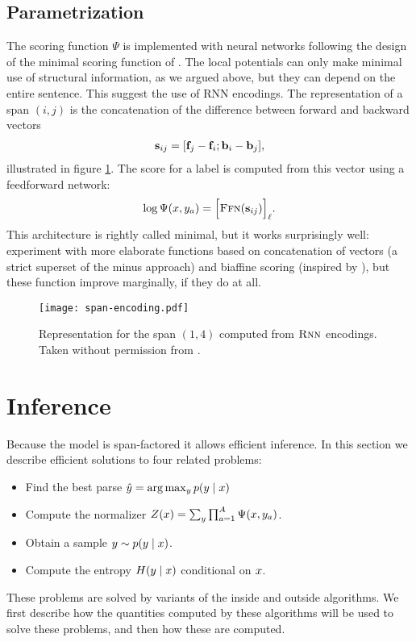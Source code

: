 \subsection{Parametrization}
The scoring function $\Psi$ is implemented with neural networks following the design of the minimal scoring function of \citet{stern2017minimal}. The local potentials can only make minimal use of structural information, as we argued above, but they can depend on the entire sentence. This suggest the use of RNN encodings. The representation of a span $(i, j)$ is the concatenation of the difference between forward and backward vectors
\begin{align}
  \label{eq:potential-function}
  \mathbf{s}_{ij} = [\mathbf{f}_j - \mathbf{f}_i; \mathbf{b}_i - \mathbf{b}_j],
\end{align}
illustrated in figure \ref{fig:span-feature}. The score for a label is computed from this vector using a feedforward network:
\begin{align}
  \log \Psi(x, y_a) = \Big[ \textsc{Ffn}( \mathbf{s}_{ij} ) \Big]_{\ell}.
\end{align}
This architecture is rightly called minimal, but it works surprisingly well: \citet{stern2017minimal} experiment with more elaborate functions based on concatenation of vectors (a strict superset of the minus approach) and biaffine scoring (inspired by \citep{dozat2016deep}), but these function improve marginally, if they do at all.

\begin{figure}
  \texttt{[image: span-encoding.pdf]}
  \caption{Representation for the span $(1, 4)$ computed from $\textsc{Rnn}$ encodings. Taken without permission from \citet{stern2018analyis}.}
  \label{fig:span-feature}
\end{figure}

\section{Inference}
Because the model is span-factored it allows efficient inference. In this section we describe efficient solutions to four related problems:
\begin{itemize}
  \item Find the best parse $\hat{ y } = \arg \max_{y } p(y  \mid x)$
  \item Compute the normalizer $Z(x) = \sum_{ y  } \prod_{ a=1 }^{ A } \Psi( x, y_a )$.
  \item Obtain a sample $y \sim p(y  \mid x)$.
  \item Compute the entropy $H(y \mid x)$ conditional on $x$.
\end{itemize}
These problems are solved by variants of the inside and outside algorithms. We first describe how the quantities computed by these algorithms will be used to solve these problems, and then how these are computed.

